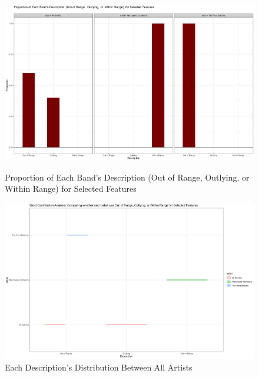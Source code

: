 \documentclass{article}\usepackage[]{graphicx}\usepackage[]{xcolor}
\begin{document}
\begin{figure}[!htbp]
    \centering
    \includegraphics[width=1.05\textwidth, trim=0 0 0 50, clip]{bar.png}
    \caption{Proportion of Each Band's Description  (Out of Range,  Outlying,  or  Within Range)  for Selected Features}
    \vspace{0.20cm} 
    \includegraphics[width=1.05\textwidth, trim=0 0 0 50, clip]{Plot.png}
    \caption{Each Description's Distribution Between All Artists}
\end{figure}
\end{document}
